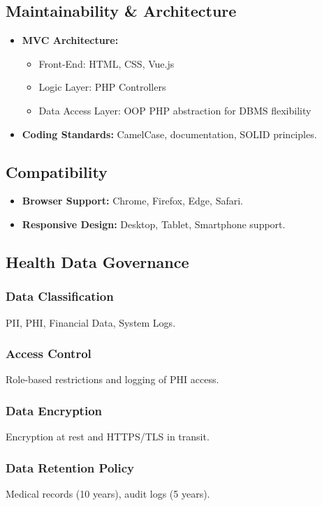 \subsection{Maintainability \& Architecture}
\begin{itemize}
	\item \textbf{MVC Architecture:}
	\begin{itemize}
		\item Front-End: HTML, CSS, Vue.js
		\item Logic Layer: PHP Controllers
		\item Data Access Layer: OOP PHP abstraction for DBMS flexibility
	\end{itemize}
	\item \textbf{Coding Standards:} CamelCase, documentation, SOLID principles.
\end{itemize}

\subsection{Compatibility}
\begin{itemize}
	\item \textbf{Browser Support:} Chrome, Firefox, Edge, Safari.
	\item \textbf{Responsive Design:} Desktop, Tablet, Smartphone support.
\end{itemize}

\subsection{Health Data Governance}

\subsubsection{Data Classification}
PII, PHI, Financial Data, System Logs.

\subsubsection{Access Control}
Role-based restrictions and logging of PHI access.

\subsubsection{Data Encryption}
Encryption at rest and HTTPS/TLS in transit.

\subsubsection{Data Retention Policy}
Medical records (10 years), audit logs (5 years).

